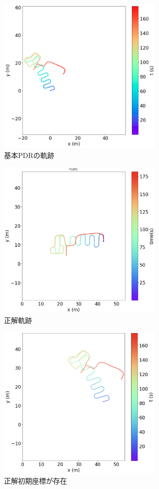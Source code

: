\begin{figure}[ht]
	\centering
	\includegraphics[width=80mm]{image/pdr.jpg}
	\caption{基本PDRの軌跡}    \label{fig:pdr}
\end{figure}

\begin{figure}[ht]
	\centering
	\includegraphics[width=80mm]{image/gt2.jpg}
	\caption{正解軌跡}    \label{fig:gt-trajectory}
\end{figure}

\begin{figure}[ht]
	\centering
	\includegraphics[width=80mm]{image/pdr-move.jpg}
	\caption{正解初期座標が存在}    \label{fig:pdr-move}
\end{figure}





